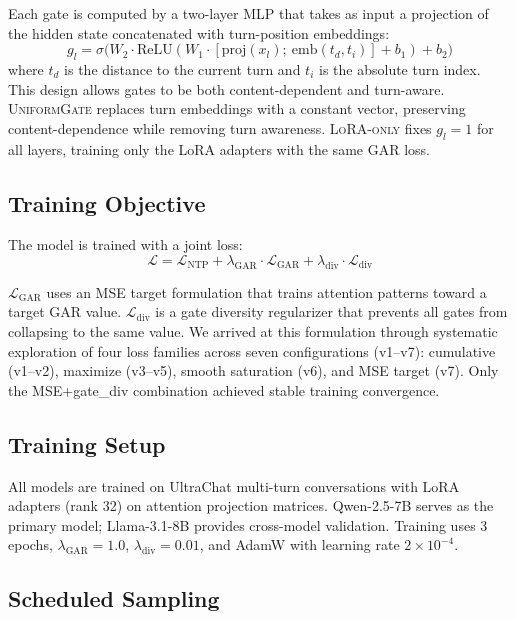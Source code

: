 \documentclass[11pt]{article}
\newcommand{\gar}{\textsc{GAR}}
\newcommand{\ug}{\textsc{UniformGate}}
\newcommand{\lo}{\textsc{LoRA-only}}
\begin{document}
Each gate is computed by a two-layer MLP that takes as input a projection of the hidden state concatenated with turn-position embeddings:
\begin{equation}
    g_l = \sigma\big(W_2 \cdot \text{ReLU}(W_1 \cdot [\text{proj}(x_l);\ \text{emb}(t_d, t_i)] + b_1) + b_2\big)
\end{equation}
where $t_d$ is the distance to the current turn and $t_i$ is the absolute turn index. This design allows gates to be both content-dependent and turn-aware. \ug{} replaces turn embeddings with a constant vector, preserving content-dependence while removing turn awareness. \lo{} fixes $g_l = 1$ for all layers, training only the LoRA adapters with the same \gar{} loss.

\subsection{Training Objective}

The model is trained with a joint loss:
\begin{equation}
    \mathcal{L} = \mathcal{L}_{\text{NTP}} + \lambda_{\text{GAR}} \cdot \mathcal{L}_{\text{GAR}} + \lambda_{\text{div}} \cdot \mathcal{L}_{\text{div}}
\end{equation}

$\mathcal{L}_{\text{GAR}}$ uses an MSE target formulation that trains attention patterns toward a target \gar{} value. $\mathcal{L}_{\text{div}}$ is a gate diversity regularizer that prevents all gates from collapsing to the same value. We arrived at this formulation through systematic exploration of four loss families across seven configurations (v1--v7): cumulative (v1--v2), maximize (v3--v5), smooth saturation (v6), and MSE target (v7). Only the MSE+gate\_div combination achieved stable training convergence.

\subsection{Training Setup}

All models are trained on UltraChat \citep{ding2023enhancing} multi-turn conversations with LoRA adapters (rank 32) on attention projection matrices. Qwen-2.5-7B \citep{yang2024qwen2} serves as the primary model; Llama-3.1-8B \citep{dubey2024llama} provides cross-model validation. Training uses 3 epochs, $\lambda_{\text{GAR}}=1.0$, $\lambda_{\text{div}}=0.01$, and AdamW with learning rate $2 \times 10^{-4}$.

\subsection{Scheduled Sampling}
\end{document}
